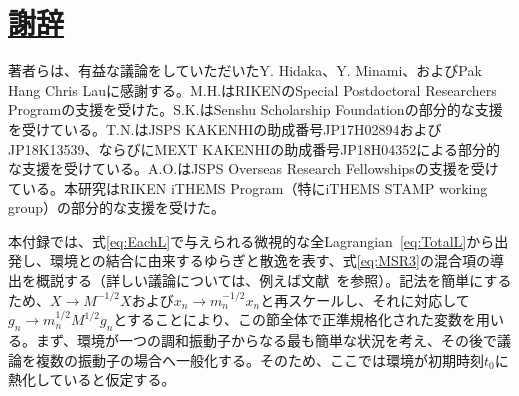\section*{\hyperlink{toc}{謝辞}}
著者らは、有益な議論をしていただいたY. Hidaka、Y. Minami、およびPak Hang Chris Lauに感謝する。M.H.はRIKENのSpecial Postdoctoral Researchers Programの支援を受けた。S.K.はSenshu Scholarship Foundationの部分的な支援を受けている。T.N.はJSPS KAKENHIの助成番号JP17H02894およびJP18K13539、ならびにMEXT KAKENHIの助成番号JP18H04352による部分的な支援を受けている。A.O.はJSPS Overseas Research Fellowshipsの支援を受けている。本研究はRIKEN iTHEMS Program（特にiTHEMS STAMP working group）の部分的な支援を受けた。

\appendix
\renewcommand{\thesection}{\Alph{section}}
\renewcommand{\theequation}{\Alph{section}.\arabic{equation}}
\label{kim}

本付録では、式\eqref{eq:EachL}で与えられる微視的な全Lagrangian~\eqref{eq:TotalL}から出発し、環境との結合に由来するゆらぎと散逸を表す、式\eqref{eq:MSR3}の混合項の導出を概説する（詳しい議論については、例えば文献~\cite{Kamenev:2009jj}を参照）。記法を簡単にするため、$X\to M^{-1/2}X$および$x_n\to m_n^{-1/2}x_n$と再スケールし、それに対応して$g_n\to m_n^{1/2}M^{1/2}g_n$とすることにより、この節全体で正準規格化された変数を用いる。まず、環境が一つの調和振動子からなる最も簡単な状況を考え、その後で議論を複数の振動子の場合へ一般化する。そのため、ここでは環境が初期時刻$t_0$に熱化していると仮定する。

